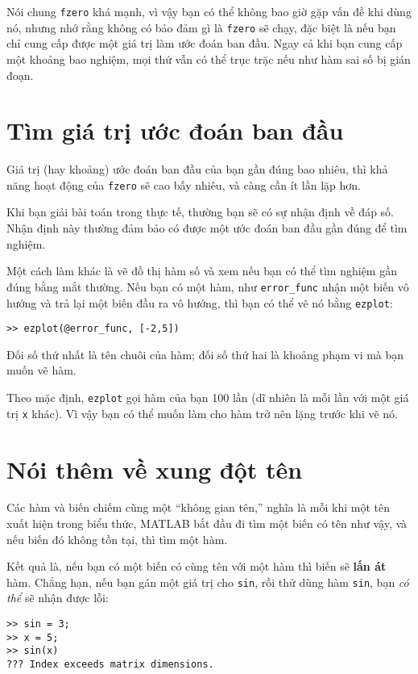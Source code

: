 \documentclass[12pt]{book}
\begin{document}
Nói chung {\tt fzero} khá mạnh, vì vậy bạn có thể không bao giờ gặp
vấn đề khi dùng nó, nhưng nhớ rằng không có bảo đảm gì là {\tt fzero}
sẽ chạy, đặc biệt là nếu bạn chỉ cung cấp được một giá trị làm ước đoán
ban đầu. Ngay cả khi bạn cung cấp một khoảng bao nghiệm, mọi thứ
vẫn có thể trục trặc nếu như hàm sai số bị gián đoạn.


\section{Tìm giá trị ước đoán ban đầu}

Giá trị (hay khoảng) ước đoán ban đầu của bạn gần đúng bao nhiêu, thì
khả năng hoạt động của {\tt fzero} sẽ cao bấy nhiêu, và càng cần ít
lần lặp hơn.

Khi bạn giải bài toán trong thực tế, thường bạn sẽ có sự nhận định
về đáp số. Nhận định này thường đảm bảo có được một ước đoán
ban đầu gần đúng để tìm nghiệm.

Một cách làm khác là vẽ đồ thị hàm số và xem nếu bạn có thể
tìm nghiệm gần đúng bằng mắt thường. Nếu bạn có một hàm,
như \verb#error_func# nhận một biến vô hướng và trả lại một
biến đầu ra vô hướng, thì bạn có thể vẽ nó bằng {\tt ezplot}:

\begin{verbatim}
>> ezplot(@error_func, [-2,5])
\end{verbatim}

Đối số thứ nhất là tên chuôi của hàm; đối số thứ hai là khoảng
phạm vi mà bạn muốn vẽ hàm.

Theo mặc định, {\tt ezplot} gọi hàm của bạn 100 lần (dĩ nhiên là mỗi lần
với một giá trị {\tt x} khác). Vì vậy bạn có thể muốn làm cho hàm trở nên
lặng trước khi vẽ nó.


\section{Nói thêm về xung đột tên}

Các hàm và biến chiếm cùng một ``không gian tên,'' nghĩa là mỗi khi 
một tên xuất hiện trong biểu thức, MATLAB bắt đầu đi tìm một biến
có tên như vậy, và nếu biến đó không tồn tại, thì tìm một hàm.

Kết quả là, nếu bạn có một biến có cùng tên với một hàm thì biến sẽ 
{\bf lấn át} hàm. Chẳng hạn, nếu bạn gán một giá trị cho {\tt sin}, 
rồi thử dùng hàm {\tt sin}, bạn {\em có thể} sẽ nhận được lỗi:

\begin{verbatim}
>> sin = 3;
>> x = 5;
>> sin(x)
??? Index exceeds matrix dimensions.
\end{verbatim}
\end{document}
